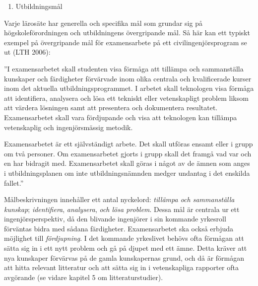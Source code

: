 \begin{enumerate}
\def\labelenumi{\arabic{enumi}.}
\item
  Utbildningsmål
\end{enumerate}

Varje lärosäte har generella och specifika mål som grundar sig på
högskoleförordningen och utbildningens övergripande mål. Så här kan ett
typiskt exempel på övergripande mål för examensarbete på ett
civilingenjörsprogram se ut (LTH 2006):

''I examensarbetet skall studenten visa förmåga att tillämpa och
sammanställa kunskaper och färdigheter förvärvade inom olika centrala
och kvalificerade kurser inom det aktuella utbildningsprogrammet. I
arbetet skall teknologen visa förmåga att identifiera, analysera och
lösa ett tekniskt eller vetenskapligt problem liksom att värdera
lösningen samt att presentera och dokumentera resultatet. Examensarbetet
skall vara fördjupande och visa att teknologen kan tillämpa vetenskaplig
och ingenjörsmässig metodik.

Examensarbetet är ett självständigt arbete. Det skall utföras ensamt
eller i grupp om två personer. Om examensarbetet gjorts i grupp skall
det framgå vad var och en har bidragit med. Examensarbetet skall göras i
något av de ämnen som anges i utbildningsplanen om inte
utbildningsnämnden medger undantag i det enskilda fallet.''

Målbeskrivningen innehåller ett antal nyckelord: \emph{tillämpa och
sammanställa kunskap}; \emph{identifiera}, \emph{analysera}, \emph{och
lösa problem}. Dessa mål är centrala ur ett ingenjörsperspektiv, då den
blivande ingenjörer i sin kommande yrkesroll förväntas bidra med sådana
färdigheter. Examensarbetet ska också erbjuda möjlighet till
\emph{fördjupning}. I det kommande yrkeslivet behövs ofta förmågan att
sätta sig in i ett nytt problem och gå på djupet med ett ämne. Detta
kräver att nya kunskaper förvärvas på de gamla kunskapernas grund, och
då är förmågan att hitta relevant litteratur och att sätta sig in i
vetenskapliga rapporter ofta avgörande (se vidare kapitel 5 om
litteraturstudier).

